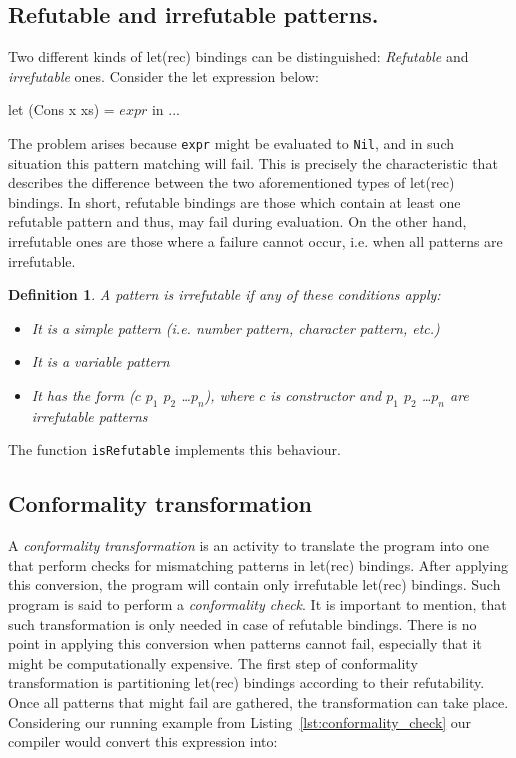 \documentclass[12pt,a4paper]{report}
\newtheorem{definition}{Definition}[chapter]
\begin{document}
\subsection{Refutable and irrefutable patterns.}
\label{sec:irrefutable_patterns}
Two different kinds of let(rec) bindings can be distinguished:
\textit{Refutable} and \textit{irrefutable} ones. Consider the let expression
below:

\vspace*{0.2in}
\begin{code}[style=haskell,mathescape=true,label=lst:conformality_check,caption={Pattern matching let binding.}]
  let (Cons x xs) = $expr$ in ...
\end{code}

The problem arises because \texttt{expr} might be evaluated to \texttt{Nil},
and in such situation this pattern matching will fail. This is precisely the
characteristic that describes the difference between the two aforementioned
types of let(rec) bindings. In short, refutable bindings are those which contain
at least one refutable pattern and thus, may fail during evaluation. On the
other hand, irrefutable ones are those where a failure cannot occur, i.e. when
all patterns are irrefutable.

\begin{definition}
  \label{def:irrefutable_pattern}
  A pattern is irrefutable if any of these conditions apply:
  \begin{itemize}
    \item It is a simple pattern (i.e. number pattern, character pattern, etc.)
    \item It is a variable pattern
    \item It has the form ($c$ $p_{1}$ $p_{2}$ \ldots $p_{n}$), where $c$ is
      constructor and $p_{1}$ $p_{2}$ \ldots $p_{n}$ are irrefutable patterns
  \end{itemize}
\end{definition}
The function \texttt{isRefutable} implements this behaviour.

\subsection{Conformality transformation}
\label{sec:conformality_transformation}
A \textit{conformality transformation} is an activity to translate the program
into one that perform checks for mismatching patterns in let(rec) bindings.
After applying this conversion, the program will contain only irrefutable
let(rec) bindings. Such program is said to perform a \textit{conformality
check}. It is important to mention, that such transformation is only needed in
case of refutable bindings. There is no point in applying this conversion when
patterns cannot fail, especially that it might be computationally expensive.
The first step of conformality transformation is partitioning let(rec) bindings
according to their refutability. Once all patterns that might fail are
gathered, the transformation can take place. Considering our running example
from Listing~\ref{lst:conformality_check} our compiler would convert this
expression into:
\end{document}
